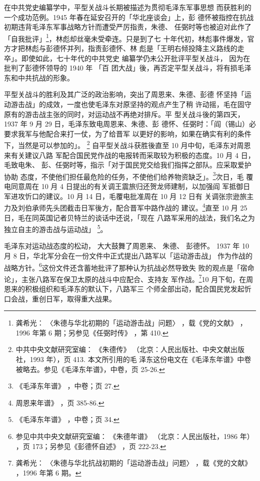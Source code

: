 在中共党史编纂学中，平型关战斗长期被描述为贯彻毛泽东军事思想
而获胜利的一个成功范例。1945 年春在延安召开的「华北座谈会」上，彭
德怀被指控在抗战初期违背毛泽东军事战略方针而遭受严厉指责，朱德、
任弼时等也被迫对此作了「自我批评」\footnote{龚希光：
〈朱德与华北初期的「运动游击战」问题〉
，载《党的文献》
，1996 年第 6 期；另参见《任弼时传》
，第
410.}，林彪却丝毫未受牵连。只是到了七
十年代初，林彪事件爆发，官方才把林彪与彭德怀并列，指责彭德怀、林
彪是「王明右倾投降主义路线的走卒」。即使如此，七十年代的中共党史
编纂学仍未公开批评平型关战斗，
因为在批判了彭德怀领导的 1940 年
「百
团大战」後，再否定平型关战斗，将有损毛泽东和中共抗战的形象。
 
平型关战斗的胜利及其广泛的政治影响，突出了周恩来、朱德、彭德
怀坚持「运动游击战」的成效，一度也使毛泽东对原坚持的观点产生了稍
许动摇，毛在固守原有的游击战主张的同时，对运动战不再绝对排斥。平
型关战斗後的第四天，1937 年 9 月 29 日，毛泽东致电周恩来、朱德、彭
德怀、任弼时：「阎（锡山）必要求我军与他配合来打一仗，为了给晋军
以更好的影响，如果在确实有利的条件下，当然是可以参加的」。
\footnote{中共中央文献研究室编：
《朱德传》
（北京：人民出版社、中央文献出版社，1993 年），页 413. 本文所引用的毛
泽东这份电文在《毛泽东年谱》中卷被略去。参见《毛泽东年谱》，中卷，页 25-26. } 
自平型关战斗获胜後直至 10 月中旬，毛泽东对周恩来有关建议八路
军配合国民党作战的电报转而采取较为积极的态度。10 月 4 日，
毛致电朱、
彭、任弼时等，指示「对于国民党交给我们指挥之部队。应采取爱护协助
态度，不使他们担任最危险的任务，不使他们给养物资缺乏」。\footnote{《毛泽东年谱》
，中卷；页 27.}次日，毛
覆电同意周在 10 月 4 日提出的有关调王震旅归还贺龙师建制，以加强阎
军抵御日军进攻忻口的建议。10 月 14 日，毛覆电批准周在 10 月 12 日有
关调张宗逊旅主力及刘伯承师先头团截击日军後方，配合晋军中路作战的
建议。\footnote{周恩来年谱》
，页 385-86.}直至 10 月 25 日，毛在同英国记者贝特兰的谈话中还说，「现在
八路军采用的战法，我们名之为独立自主的游击战与运动战」
\footnote{《毛泽东年谱》
，中卷；页 34.}。

毛泽东对运动战态度的松动，
大大鼓舞了周恩来、
朱德、
彭德怀。
1937 年 10 月 8 日，华北军分会在一份文件中正式提出八路军以「运动游击战」
作为作战的战略方针。\footnote{参见中共中央文献研究室编：
《朱德年谱》
（北京：人民出版社，1986 年）
，页 173；另参见《彭德怀自述》
，页
222-23.}这份文件还含蓄地批评了那种认为抗战必然导致失
败的观点是「宿命论」，主张八路军在保卫太原的战斗中应配合、支持友
军作战。\footnote{龚希光：
〈朱德与华北抗战初期的「运动游击战」问题〉
，载《党的文献》
，1996 年第 6 期。}10 月下旬，在周恩来的积极组织和毛泽东的默认下，八路军三
个师全部出动，配合国民党发起忻口会战，重创日军，取得重大战果。
 
